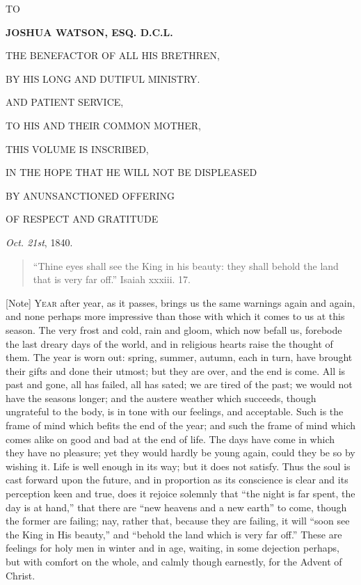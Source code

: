 




TO



\textbf{JOSHUA WATSON, ESQ. D.C.L.}



THE BENEFACTOR OF ALL HIS BRETHREN,


BY HIS LONG AND DUTIFUL MINISTRY.


AND PATIENT SERVICE,


TO HIS AND THEIR COMMON MOTHER,



THIS VOLUME IS INSCRIBED,



IN THE HOPE THAT HE WILL NOT BE DISPLEASED


BY AN\textbf{}UNSANCTIONED OFFERING


OF RESPECT AND GRATITUDE


\emph{Oct. 21st}, 1840.


\begin{quote}

``Thine eyes shall see the King in his beauty: they shall
behold the land that is very far off.'' Isaiah xxxiii. 17.

\end{quote}

[Note] Y\textsc{ear} after year, as it passes, brings us the same warnings again
and again, and none perhaps more impressive than those with which it
comes to us at this season.
The very frost and cold, rain and gloom, which now befall us, forebode
the last dreary days of the world, and in religious hearts raise the
thought of them. The year is worn out: spring, summer, autumn, each in
turn, have brought their gifts and done their utmost; but they are
over, and the end is come. All is past and gone, all has failed, all
has sated; we are tired of the past; we would not have the seasons
longer; and the austere weather which succeeds, though ungrateful to
the body, is in tone with our feelings, and acceptable. Such is the
frame of mind which befits the end of the year; and such the frame of
mind which comes alike on good and bad at the end of life. The days
have come in which they have no pleasure; yet they would hardly be
young again, could they be so by wishing it. Life is well enough in
its way; but it does not satisfy. Thus the soul is cast forward upon
the future, and in proportion as its conscience is clear and its
perception keen and true, does it rejoice solemnly that ``the
night is far spent, the day is at hand,'' that there are ``new
heavens and a new earth'' to come, though the former are failing;
nay, rather that, because they are failing, it will ``soon see the
King in His beauty,'' and ``behold the land which is very far
off.'' These are feelings for holy men in winter and in age,
waiting, in some dejection perhaps, but with comfort on the whole, and
calmly though earnestly, for the Advent of Christ.

